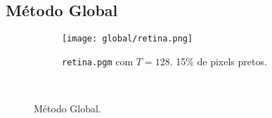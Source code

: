 \subsection{Método Global}

\begin{figure}[H]
    \centering
    \begin{subfigure}{0.6\textwidth}
        \centering\newlength{\figwidth}\setlength{\figwidth}{0.9\textwidth}
        \texttt{[image: global/retina.png]}
        \caption{\texttt{retina.pgm} com $T = 128$. 15\% de pixels pretos.}
    \end{subfigure}\\[8pt]

    \caption{Método Global.}
    \label{fig:global}
\end{figure}
